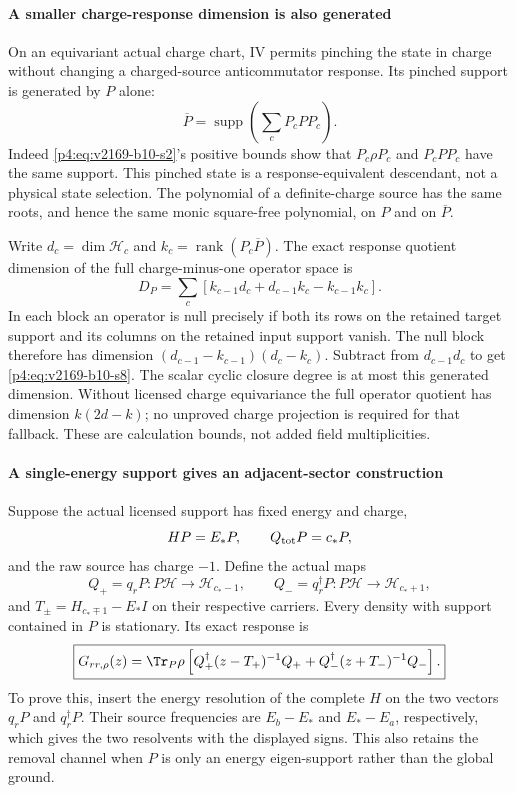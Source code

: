 \documentclass[12pt,a4paper]{article}
\begin{document}
\paragraph{A smaller charge-response dimension is also generated}
On an equivariant actual charge chart, IV permits pinching the state in
charge without changing a charged-source anticommutator response. Its
pinched support is generated by $P$ alone:
\begin{equation}
 \overline P=\operatorname{supp}\left(\sum_cP_cPP_c\right).
 \label{p4:eq:v2169-b10-s7}
\end{equation}
Indeed \eqref{p4:eq:v2169-b10-s2}'s positive bounds show that $P_c\rho P_c$ and $P_cPP_c$ have
the same support. This pinched state is a response-equivalent descendant,
not a physical state selection. The polynomial of a definite-charge source
has the same roots, and hence the same monic square-free polynomial, on
$P$ and on $\overline P$.

Write $d_c=\dim\mathcal H_c$ and
$k_c=\operatorname{rank}(P_c\overline P)$. The exact response quotient dimension of
the full charge-minus-one operator space is
\begin{equation}
 \boxed{D_P=\sum_c
 [k_{c-1}d_c+d_{c-1}k_c-k_{c-1}k_c].}
 \label{p4:eq:v2169-b10-s8}
\end{equation}
In each block an operator is null precisely if both its rows on the retained
target support and its columns on the retained input support vanish.
The null block therefore has dimension
$(d_{c-1}-k_{c-1})(d_c-k_c)$. Subtract from $d_{c-1}d_c$ to get \eqref{p4:eq:v2169-b10-s8}.
The scalar cyclic closure degree is at most this generated dimension.
Without licensed charge equivariance the full operator quotient has
dimension $k(2d-k)$; no unproved charge projection is required for that
fallback. These are calculation bounds, not added field multiplicities.



\paragraph{A single-energy support gives an adjacent-sector construction}
Suppose the actual licensed support has fixed energy and charge,
\[
 HP=E_*P,\qquad Q_{\rm tot}P=c_*P,
\]
and the raw source has charge $-1$. Define the actual maps
\[
 Q_+=q_rP:P\mathcal H\to\mathcal H_{c_*-1},\qquad
 Q_-=q_r^\dagger P:P\mathcal H\to\mathcal H_{c_*+1},
\]
and $T_\pm=H_{c_*\mp1}-E_*I$ on their respective carriers.
Every density with support contained in $P$ is stationary. Its exact response is
\begin{equation}
 \boxed{G_{rr,\rho}(z)=\Tr_P\rho
 \left[Q_+^\dagger(z-T_+)^{-1}Q_+
             +Q_-^\dagger(z+T_-)^{-1}Q_-\right].}
 \label{p4:eq:v2169-b10-s9}
\end{equation}
To prove this, insert the energy resolution of the complete $H$ on the two
vectors $q_rP$ and $q_r^\dagger P$. Their source frequencies are
$E_b-E_*$ and $E_*-E_a$, respectively, which gives the two resolvents with
the displayed signs. This also retains the removal channel when $P$ is only
an energy eigen-support rather than the global ground.
\end{document}
